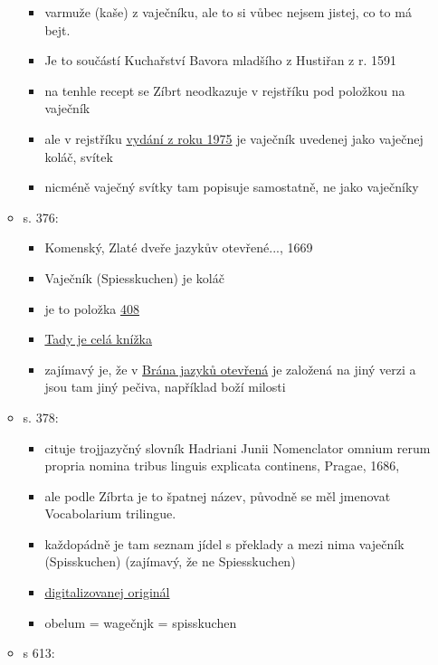 \begin{itemize}
\begin{itemize}
    \begin{itemize}
    \tightlist
    \item
      varmuže (kaše) z vaječníku, ale to si vůbec nejsem jistej, co to
      má bejt.
    \item
      Je to součástí Kuchařství Bavora mladšího z Hustiřan z r. 1591
    \item
      na tenhle recept se Zíbrt neodkazuje v rejstříku pod položkou na
      vaječník
    \item
      ale v rejstříku
      \href{https://ndk.cz/uuid/uuid:27bccb70-88d6-11e3-997d-005056827e52}{vydání
      z roku 1975} je vaječník uvedenej jako vaječnej koláč, svítek
    \item
      nicméně vaječný svítky tam popisuje samostatně, ne jako vaječníky
    \end{itemize}
  \item
    s. 376:

    \begin{itemize}
    \tightlist
    \item
      Komenský, Zlaté dveře jazykův otevřené..., 1669
    \item
      Vaječník (Spiesskuchen) je koláč
    \item
      je to položka
      \href{https://vokabular.ujc.cas.cz/moduly/mluvnice/digitalni-kopie-detail/KomJanua1669/strana-76}{408}
    \item
      \href{https://vokabular.ujc.cas.cz/moduly/mluvnice/digitalni-kopie-info/KomJanua1669}{Tady
      je celá knížka}
    \item
      zajímavý je, že v
      \href{https://www.digitalniknihovna.cz/mzk/view/uuid:c53f79b0-b747-11e4-a7a2-005056827e51?page=uuid:c976bf00-bdcf-11e4-ba2b-5ef3fc9bb22f&fulltext=kol\%C3\%A1\%C4\%8D\%C5\%AF}{Brána
      jazyků otevřená} je založená na jiný verzi a jsou tam jiný pečiva,
      například boží milosti
    \end{itemize}
  \item
    s. 378:

    \begin{itemize}
    \tightlist
    \item
      cituje trojjazyčný slovník Hadriani Junii Nomenclator omnium rerum
      propria nomina tribus linguis explicata continens, Pragae, 1686,
    \item
      ale podle Zíbrta je to špatnej název, původně se měl jmenovat
      Vocabolarium trilingue.
    \item
      každopádně je tam seznam jídel s překlady a mezi nima vaječník
      (Spisskuchen) (zajímavý, že ne Spiesskuchen)
    \item
      \href{https://www.digitale-sammlungen.de/view/bsb11105115?page=42\%2C43}{digitalizovanej
      originál}
    \item
      obelum = wagečnjk = spisskuchen
    \end{itemize}
  \item
    s 613:


\end{itemize}
\end{itemize}
